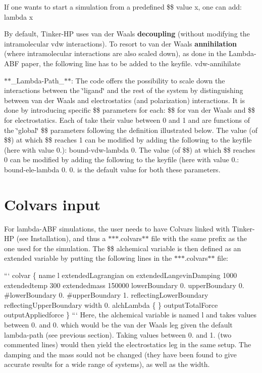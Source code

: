 If one wants to start a simulation from a predefined \$\$ value x, one can add\-: {\ttfamily lambda x}

By default, Tinker-\/\-H\-P uses van der Waals {\bfseries decoupling} (without modifying the intramolecular vdw interactions). To resort to van der Waals {\bfseries annihilation} (where intramolecular interactions are also scaled down), as done in the Lambda-\/\-A\-B\-F paper, the following line has to be added to the keyfile. {\ttfamily vdw-\/annihilate}

$\ast$$\ast$\-\_\-\-Lambda-\/\-Path\-\_\-$\ast$$\ast$\-: The code offers the possibility to scale down the interactions between the \char`\"{}ligand\char`\"{} and the rest of the system by distinguishing between van der Waals and electrostatics (and polarization) interactions. It is done by introducing specific \$\$ parameters for each\-: \$\$ for van der Waals and \$\$ for electrostatics. Each of take their value between 0 and 1 and are functions of the \char`\"{}global\char`\"{} \$\$ parameters following the definition illustrated below.  The value (of \$\$) at which \$\$ reaches 1 can be modified by adding the following to the keyfile (here with value 0.)\-: {\ttfamily bound-\/vdw-\/lambda 0. } The value (of \$\$) at which \$\$ reaches 0 can be modified by adding the following to the keyfile (here with value 0.\-: {\ttfamily bound-\/ele-\/lambda 0. } 0. is the default value for both these parameters.

\section*{Colvars input}

For lambda-\/\-A\-B\-F simulations, the user needs to have Colvars linked with Tinker-\/\-H\-P (see Installation), and thus a $\ast$$\ast$$\ast$.colvars$\ast$$\ast$ file with the same prefix as the one used for the simulation. The \$\$ alchemical variable is then defined as an extended variable by putting the following lines in the $\ast$$\ast$$\ast$.colvars$\ast$$\ast$ file\-:

``` colvar \{ name l extended\-Lagrangian on extended\-Langevin\-Damping 1000 extendedtemp 300 extendedmass 150000 lower\-Boundary 0. upper\-Boundary 0. \#lower\-Boundary 0. \#upper\-Boundary 1. reflecting\-Lower\-Boundary reflecting\-Upper\-Boundary width 0. alch\-Lambda \{ \} output\-Total\-Force output\-Appliedforce \} ``` Here, the alchemical variable is named l and takes values between 0. and 0. which would be the van der Waals leg given the default lambda-\/path (see previous section). Taking values between 0. and 1. (two commented lines) would then yield the electrostatics leg in the same setup. The damping and the mass sould not be changed (they have been found to give accurate results for a wide range of systems), as well as the width.

